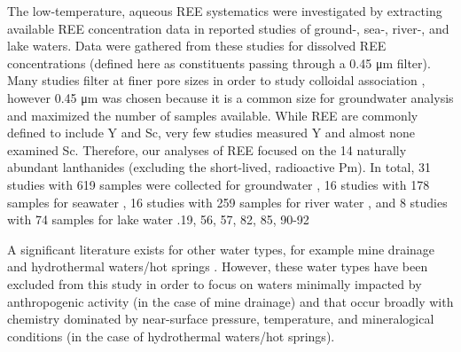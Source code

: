 The low-temperature, aqueous REE systematics were investigated by extracting available REE concentration data in reported studies of ground-, sea-, river-, and lake waters.
Data were gathered from these studies for dissolved REE concentrations (defined here as constituents passing through a 0.45 \si{\um} filter). 
Many studies filter at finer pore sizes in order to study colloidal association \citep{Dia_GCA_2000, Pourret_JCIS_2007, Stolpe_GCA_2013},
however 0.45 \si{\um} was chosen because it is a common size for groundwater analysis and  maximized the number of samples available.
While REE are commonly defined to include Y and Sc, very few studies measured Y and almost none examined Sc.
Therefore, our analyses of REE focused on the 14 naturally abundant lanthanides (excluding the short-lived, radioactive Pm).
In total, 31 studies with 619 samples were collected for groundwater
\citep{Choi_CG_2009, BwireOjiambo_AG_2003, Siebert_AG_2012, Dia_GCA_2000, Gruau_WR_2004, Pourret_AG_2010, Johannesson_GCA_1999, Johannesson_CG_2000, Tang_CG_2006, Willis_CG_2011, Tweed_CG_2006, Johannesson_GCA_2000, Duncan_AG_2003, Smedley_GCA_1991, Gosselin_GCA_1992, Tricca_CG_1999, Johannesson_CG_1996, Michard_GCA_1987, Janssen_WR_2003, Worrall_AG_2001, Yan_CG_2001, Moller_AG_1998, Guo_CG_2010, Johannesson_AG_1995, Leybourne_AG_2000, deBoer_WR_1996, Miekeley_JGE_1992, Negrel_AG_2000, E-V_EES_2012, Otsuka_GJ_2003, Nelson_GEEA_2004},
16 studies with 178 samples for seawater
\citep{DeBaar_Nat_1983, Duncan_AG_2003, Alibo_GCA_1999, Bau_MC_1997, Elderfield_Nat_1982, Elderfield_GCA_1990, Fu_Tal_2007, Haley_MC_2003, Hirata_Tal_2002, Nozaki_GCA_1999, Piepgras_GCA_1992, Schijf_GCA_1995, Sholkovitz_GCA_1994, Vicente_SAB_1998, Zhu_JAC_2006, Nozaki_GCA_2000},
16 studies with 259 samples for river water
\citep{Hannigan_CG_2001, BwireOjiambo_AG_2003, Tricca_CG_1999, Elderfield_GCA_1990, Nozaki_GCA_1999, Astrom_WR_2003, Biddau_CG_2002, Centeno_AG_2004, Gammons_GCA_2005, Gammons_CG_2005, Han_AG_2007, Ingri_CG_2000, Johannesson_CG_2004, Lawrence_AG_2006, Sholkovitz_EPSL_1992, Tang_GCA_2003, Zhang_AG_1998},
and 8 studies with 74 samples for lake water
\citep{BwireOjiambo_AG_2003, Johannesson_AG_1995, Leybourne_AG_2000, Gammons_CG_2005, Johannesson_CG_2004, DeCarlo_GCA_2002, Johannesson_LO_1994, Johannesson_CG_1995}.19, 56, 57, 82, 85, 90-92

A significant literature exists for other water types, for example mine drainage \citep{Borrego_HR_2012, Bozau_AG_2004, Doulati_JEE_2013, Romero_AG_2010, Verplank_AG_2004, Worrall_GCA_2001, Zhao_IJCG_2007} and hydrothermal waters/hot springs \citep{Haas_GCA_1995, Lepel_conf_1988, Michard_GCA_1989, Lewis_GCA_1997, Lewis_GCA_1998, Sanada_Geotherm_2006}.
However, these water types have been excluded from this study in order to focus on waters minimally impacted by anthropogenic activity (in the case of mine drainage) and that occur broadly with chemistry dominated by near-surface pressure, temperature, and mineralogical conditions (in the case of hydrothermal waters/hot springs).

